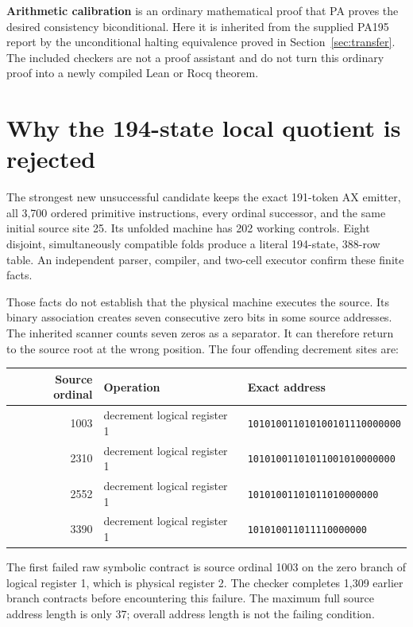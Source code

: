 \documentclass[11pt,letterpaper]{article}
\begin{document}
\textbf{Arithmetic calibration} is an ordinary mathematical proof that
PA proves the desired consistency biconditional. Here it is inherited
from the supplied PA195 report by the unconditional halting equivalence
proved in Section~\ref{sec:transfer}. The included checkers are not a proof
assistant and do not turn this ordinary proof into a newly compiled
Lean or Rocq theorem.



\section{Why the 194-state local quotient is rejected}
\label{sec:failure}
The strongest new unsuccessful candidate keeps the exact 191-token
AX emitter, all 3,700 ordered primitive instructions, every ordinal
successor, and the same initial source site 25. Its unfolded machine has
202 working controls. Eight disjoint, simultaneously compatible folds
produce a literal 194-state, 388-row table. An independent parser,
compiler, and two-cell executor confirm these finite facts.

Those facts do not establish that the physical machine executes the source.
Its binary association creates seven consecutive zero bits in some source
addresses. The inherited scanner counts seven zeros as a separator.
It can therefore return to the source root at the wrong position.
The four offending decrement sites are:
\begin{center}
\small
\begin{tabular}{rll}
\toprule
Source ordinal & Operation & Exact address\\
\midrule
1003 & decrement logical register 1 &
\texttt{101010011010100101110000000}\\
2310 & decrement logical register 1 &
\texttt{10101001101011001010000000}\\
2552 & decrement logical register 1 &
\texttt{10101001101011010000000}\\
3390 & decrement logical register 1 &
\texttt{101010011011110000000}\\
\bottomrule
\end{tabular}
\end{center}
The first failed raw symbolic contract is source ordinal 1003 on the
zero branch of logical register 1, which is physical register 2.
The checker completes 1,309 earlier branch contracts before encountering
this failure. The maximum full source address length is only 37;
overall address length is not the failing condition.
\end{document}
